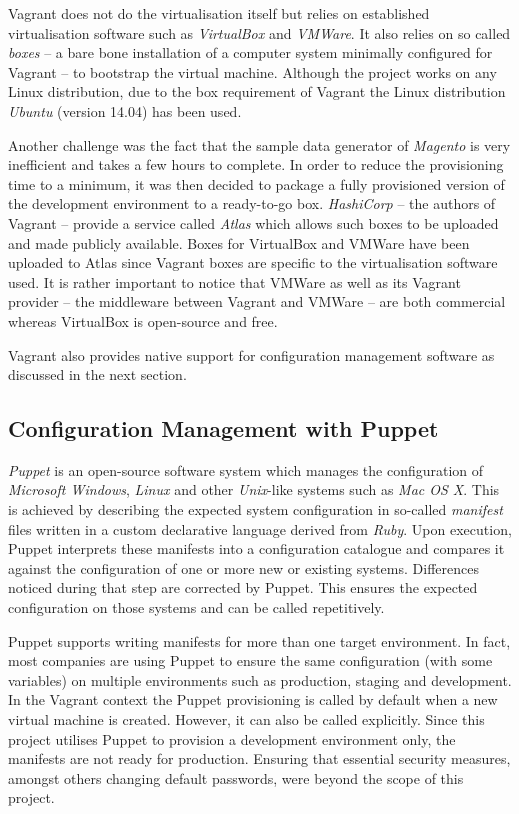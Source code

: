 Vagrant does not do the virtualisation itself but relies on established virtualisation software such as \emph{VirtualBox} and \emph{VMWare}. It also relies on so called \emph{boxes} -- a bare bone installation of a computer system minimally configured for Vagrant -- to bootstrap the virtual machine. Although the project works on any Linux distribution, due to the box requirement of Vagrant the Linux distribution \emph{Ubuntu} (version 14.04) has been used.

Another challenge was the fact that the sample data generator of \emph{Magento} is very inefficient and takes a few hours to complete. In order to reduce the provisioning time to a minimum, it was then decided to package a fully provisioned version of the development environment to a ready-to-go box. \emph{HashiCorp} -- the authors of Vagrant -- provide a service called \emph{Atlas} which allows such boxes to be uploaded and made publicly available. Boxes for VirtualBox and VMWare have been uploaded to Atlas since Vagrant boxes are specific to the virtualisation software used. It is rather important to notice that VMWare as well as its Vagrant provider -- the middleware between Vagrant and VMWare -- are both commercial whereas VirtualBox is open-source and free.

Vagrant also provides native support for configuration management software as discussed in the next section.

\subsection{Configuration Management with Puppet}

\emph{Puppet} is an open-source software system which manages the configuration of \emph{Microsoft Windows}, \emph{Linux} and other \emph{Unix}-like systems such as \emph{Mac OS X}. This is achieved by describing the expected system configuration in so-called \emph{manifest} files written in a custom declarative language derived from \emph{Ruby}. Upon execution, Puppet interprets these manifests into a configuration catalogue and compares it against the configuration of one or more new or existing systems. Differences noticed during that step are corrected by Puppet. This ensures the expected configuration on those systems and can be called repetitively.

Puppet supports writing manifests for more than one target environment. In fact, most companies are using Puppet to ensure the same configuration (with some variables) on multiple environments such as production, staging and development. In the Vagrant context the Puppet provisioning is called by default when a new virtual machine is created. However, it can also be called explicitly. Since this project utilises Puppet to provision a development environment only, the manifests are not ready for production. Ensuring that essential security measures, amongst others changing default passwords, were beyond the scope of this project.

